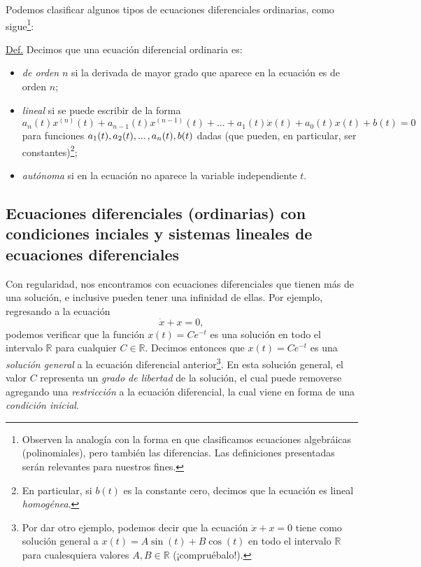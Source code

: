 \documentclass[12pt,dvipsnames]{article}
\begin{document}
\vspace{2mm}
Podemos clasificar algunos tipos de ecuaciones diferenciales ordinarias, como sigue\footnote{Observen la analogía con la forma en que clasificamos ecuaciones algebráicas (polinomiales), pero también las diferencias. Las definiciones presentadas serán relevantes para nuestros fines.}:

\vspace{3mm}
\begin{tcolorbox}
\underline{Def.} Decimos que una ecuación diferencial ordinaria es:
\begin{itemize}
    \item \emph{de orden} $n$ si la derivada de mayor grado que aparece en la ecuación es de orden $n$;
    \item \emph{lineal} si se puede escribir de la forma $$a_n(t)x^{(n)}(t)+a_{n-1}(t)x^{(n-1)}(t)+...+a_1(t)\dot{x}(t)+a_0(t)x(t)+b(t)=0$$ para funciones $a_1(t),a_2(t),...\hspace{0.5mm},a_n(t),b(t)$ dadas (que pueden, en particular, ser constantes)\footnote{En particular, si $b(t)$ es la constante cero, decimos que la ecuación es lineal \textit{homogénea}.};
    \item \emph{autónoma} si en la ecuación no aparece la variable independiente $t$.
\end{itemize}
\end{tcolorbox}

\newpage
\subsection{Ecuaciones diferenciales (ordinarias) con condiciones inciales y sistemas lineales de ecuaciones diferenciales} \label{Subsec:Ecuaciones diferenciales (ordinarias) con condiciones iniciales y sistemas lineales de ecuaciones diferenciales}

Con regularidad, nos encontramos con ecuaciones diferenciales que tienen más de una solución, e inclusive pueden tener una infinidad de ellas. Por ejemplo, regresando a la ecuación $$\dot{x} + x = 0,$$ podemos verificar que la función $x(t)=C e^{-t}$ es una solución en todo el intervalo $\mathbb{R}$ para cualquier $C\in\mathbb{R}$. Decimos entonces que $x(t)=Ce^{-t}$ es una \emph{solución general} a la ecuación diferencial anterior\footnote{Por dar otro ejemplo, podemos decir que la ecuación $\ddot{x}+x=0$ tiene como solución general a $x(t)=A\sin(t)+B\cos(t)$ en todo el intervalo $\mathbb{R}$ para cualesquiera valores $A,B\in\mathbb{R}$ (¡compruébalo!).}. En esta solución general, el valor $C$ representa un \emph{grado de libertad} de la solución, el cual puede removerse agregando una \emph{restricción} a la ecuación diferencial, la cual viene en forma de una \emph{condición inicial}.
\end{document}
